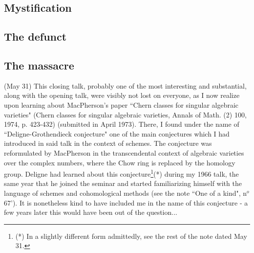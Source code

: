 
\subsection{Mystification}




\subsection{The defunct}


\subsection{The massacre}


 (May 31) This closing talk, probably one of the most interesting and substantial, along with  the opening talk, were visibly not lost on everyone, as I now realize upon learning about MacPherson's paper ``Chern classes for singular algebraic varieties" (Chern classes for singular algebraic varieties, Annals of Math. (2) 100, 1974, p. 423-432) (submitted in April 1973). There, I found under the name of ``Deligne-Grothendieck conjecture" one of the main conjectures which I had introduced in said talk in the context of schemes. The conjecture was reformulated by MacPherson in the transcendental context of algebraic varieties over the complex numbers, where the Chow ring is replaced by the homology group. Deligne had learned about this conjecture\footnote{(*) In a slightly different form admittedly, see the rest of the note dated May 31.}(*) during my 1966 talk, the same year that he joined the seminar and started familiarizing himself with the language of schemes and cohomological methods (see the note ``One of a kind", n$^o$ 67'). It is nonetheless kind to have included me in the name of this conjecture - a few years later this would have been out of the question...

